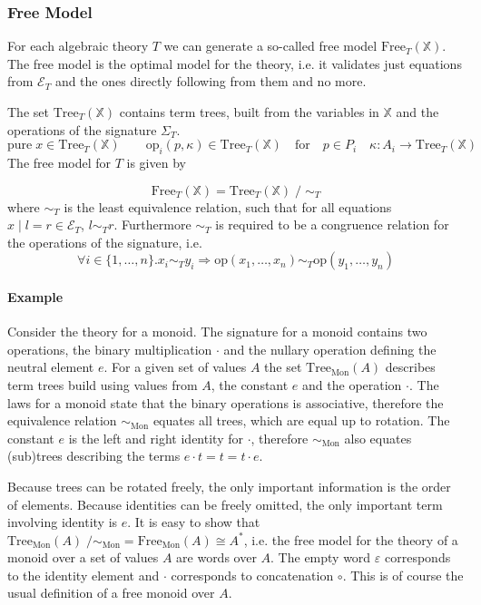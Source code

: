 \subsubsection{Free Model}

For each algebraic theory $T$ we can generate a so-called free model
$\mathrm{Free}_T(\mathbb{X})$.
The free model is the optimal model for the theory, i.e. it validates just
equations from $\mathcal{E}_T$ and the ones directly following from them and no
more.

The set $\mathrm{Tree}_T(\mathbb{X})$ contains term trees, built from the
variables in $\mathbb{X}$ and the operations of the signature $\Sigma_T$.
\[
  \mathrm{pure}\;x \in \mathrm{Tree}_T(\mathbb{X}) \qquad \mathrm{op}_i(p,\kappa)
  \in \mathrm{Tree}_T(\mathbb{X}) \quad\text{for}\quad p\in P_i \quad \kappa :
  A_i \rightarrow \mathrm{Tree}_T(\mathbb{X})
\]
The free model for $T$ is given by

\[
  \mathrm{Free}_T(\mathbb{X}) = \mathrm{Tree}_T(\mathbb{X})\; /\;\sim_T
\]
where $\sim_T$ is the least equivalence relation, such that for all equations
$x\;|\;l=r\in\mathcal{E}_T$, $l\sim_T r$.
Furthermore $\sim_T$ is required to be a congruence relation for the operations
of the signature, i.e.
\[
  \forall i\in\{1,\dots ,n\}. x_i\sim_T y_i \Rightarrow \mathrm{op}(x_1,\dots , x_n)
  \sim_T \mathrm{op}(y_1,\dots , y_n)
\]

\paragraph{Example}

Consider the theory for a monoid.
The signature for a monoid contains two operations, the binary multiplication $\cdot$
and the nullary operation defining the neutral element $e$.
For a given set of values $A$ the set $\mathrm{Tree}_{\mathrm{Mon}}(A)$ describes term trees
build using values from $A$, the constant $e$ and the operation $\cdot$.
The laws for a monoid state that the binary operations is associative, therefore
the equivalence relation $\sim_{\mathrm{Mon}}$ equates all trees, which are
equal up to rotation.
The constant $e$ is the left and right identity for $\cdot$, therefore
$\sim_{\mathrm{Mon}}$ also equates (sub)trees describing the terms $e\cdot t = t
= t \cdot e$.

Because trees can be rotated freely, the only important information is the order
of elements.
Because identities can be freely omitted, the only important term involving
identity is $e$.
It is easy to show that $\mathrm{Tree}_{\mathrm{Mon}}(A)
\;/\sim_{\mathrm{Mon}} = \mathrm{Free}_{\mathrm{Mon}}(A) \cong A^*$, i.e. the
free model for the theory of a monoid over a set of values $A$ are words over
$A$.
The empty word $\varepsilon$ corresponds to the identity element and $\cdot$
corresponds to concatenation $\circ$.
This is of course the usual definition of a free monoid over $A$.


